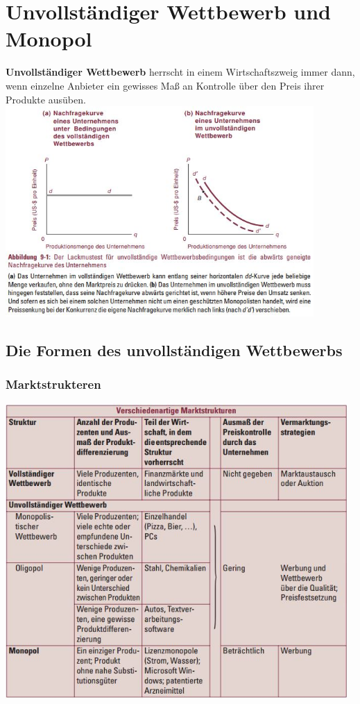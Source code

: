 \documentclass[10pt]{scrartcl}
\begin{document}
\section{Unvollständiger Wettbewerb und Monopol}
{\bf Unvollständiger Wettbewerb } herrscht in einem Wirtschaftszweig immer dann, wenn einzelne Anbieter ein gewisses Maß an Kontrolle über den Preis ihrer Produkte ausüben.\\
\includegraphics[width=0.88\textwidth]{img/unvollstandig.jpg}
\subsection{Die Formen des unvollständigen Wettbewerbs}
\subsubsection{Marktstrukteren}
\includegraphics[width=0.98\textwidth]{img/wettbewerb.jpg}
\end{document}
